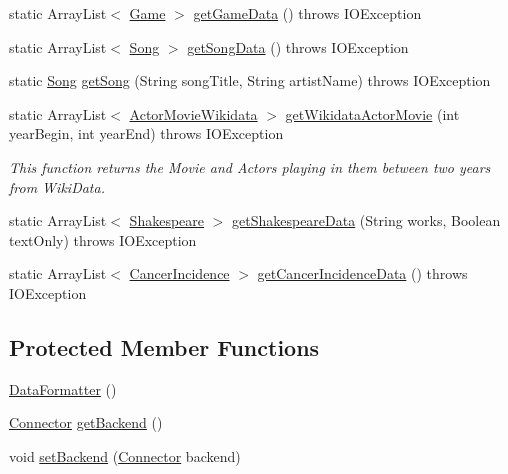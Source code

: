 \begin{DoxyCompactItemize}
\item 
static Array\+List$<$ \hyperlink{classbridges_1_1data__src__dependent_1_1_game}{Game} $>$ \hyperlink{classbridges_1_1connect_1_1_data_formatter_a4098317468be22b4284156d6cd2212e1}{get\+Game\+Data} ()  throws I\+O\+Exception 
\item 
static Array\+List$<$ \hyperlink{classbridges_1_1data__src__dependent_1_1_song}{Song} $>$ \hyperlink{classbridges_1_1connect_1_1_data_formatter_a6a2ded4ccec11234434b83a3e408fb67}{get\+Song\+Data} ()  throws I\+O\+Exception 
\item 
static \hyperlink{classbridges_1_1data__src__dependent_1_1_song}{Song} \hyperlink{classbridges_1_1connect_1_1_data_formatter_ad1d2071025ce9daa42ab69af8eb4749b}{get\+Song} (String song\+Title, String artist\+Name)  throws I\+O\+Exception 
\item 
static Array\+List$<$ \hyperlink{classbridges_1_1data__src__dependent_1_1_actor_movie_wikidata}{Actor\+Movie\+Wikidata} $>$ \hyperlink{classbridges_1_1connect_1_1_data_formatter_a7359d12ccbda0ea57de4c0ec14f9732b}{get\+Wikidata\+Actor\+Movie} (int year\+Begin, int year\+End)  throws I\+O\+Exception 
\begin{DoxyCompactList}\small\item\em This function returns the Movie and Actors playing in them between two years from Wiki\+Data. \end{DoxyCompactList}\item 
static Array\+List$<$ \hyperlink{classbridges_1_1data__src__dependent_1_1_shakespeare}{Shakespeare} $>$ \hyperlink{classbridges_1_1connect_1_1_data_formatter_ac090a4d67b38b9649bf811906f9a630a}{get\+Shakespeare\+Data} (String works, Boolean text\+Only)  throws I\+O\+Exception 
\item 
static Array\+List$<$ \hyperlink{classbridges_1_1data__src__dependent_1_1_cancer_incidence}{Cancer\+Incidence} $>$ \hyperlink{classbridges_1_1connect_1_1_data_formatter_af26cb09a93bf326fe14ad8fecf46b4f8}{get\+Cancer\+Incidence\+Data} ()  throws I\+O\+Exception 
\end{DoxyCompactItemize}
\subsection*{Protected Member Functions}
\begin{DoxyCompactItemize}
\item 
\hyperlink{classbridges_1_1connect_1_1_data_formatter_a31efd2251e98942e58e743dff213ef27}{Data\+Formatter} ()
\item 
\hyperlink{classbridges_1_1connect_1_1_connector}{Connector} \hyperlink{classbridges_1_1connect_1_1_data_formatter_a29cf4c2b0c5629d63a76b60569355c65}{get\+Backend} ()
\item 
void \hyperlink{classbridges_1_1connect_1_1_data_formatter_af9b878e5c092234a6ab5f8c11bee1fbd}{set\+Backend} (\hyperlink{classbridges_1_1connect_1_1_connector}{Connector} backend)
\end{DoxyCompactItemize}


